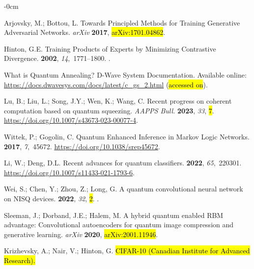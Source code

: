 \documentclass[technologies,article,accept,pdftex,moreauthors]{Definitions/mdpi}
\begin{document}
\begin{adjustwidth}{-\extralength}{0cm}
\begin{thebibliography}{999}
Arjovsky, M.; Bottou, L. Towards Principled Methods for Training Generative Adversarial Networks. \emph{arXiv} \textbf{2017},  \hl{arXiv:1701.04862}.
 

Hinton, G.E.
\newblock Training Products of Experts by Minimizing Contrastive Divergence.
 {\bf 2002}, {\em 14},~1771--1800.
.

{W}hat is {Q}uantum {A}nnealing? {D}-{W}ave {S}ystem {D}ocumentation.
 Available online: \url{https://docs.dwavesys.com/docs/latest/c_gs_2.html} (\hl{accessed on}). 

Lu, B.; Liu, L.; Song, J.Y.; Wen, K.; Wang, C.
\newblock Recent progress on coherent computation based on quantum squeezing. {\em {AAPPS} Bull.} {\bf 2023}, {\em 33}, \hl{7}. {\url{https://doi.org/10.1007/s43673-023-00077-4}}.

Wittek, P.; Gogolin, C.
\newblock Quantum Enhanced Inference in Markov Logic Networks.
 {\bf 2017}, {\em 7},~45672. {\url{https://doi.org/10.1038/srep45672}}.

Li, W.; Deng, D.L.
\newblock Recent advances for quantum classifiers.
 {\bf 2022}, {\em
  65},~220301.  {\url{https://doi.org/10.1007/s11433-021-1793-6}}.

Wei, S.; Chen, Y.; Zhou, Z.; Long, G.
\newblock A quantum convolutional neural network on NISQ devices.
 {\bf 2022}, {\em 32}, \hl{2}.
.

Sleeman, J.; Dorband, J.E.; Halem, M.
\newblock A hybrid quantum enabled RBM advantage: Convolutional autoencoders
  for quantum image compression and generative learning. \emph{arXiv} \textbf{2020},  \hl{arXiv:2001.11946}.

Krizhevsky, A.; Nair, V.; Hinton, G.
\newblock \hl{CIFAR-10 (Canadian Institute for Advanced Research).}%



\end{thebibliography}
\end{adjustwidth}
\end{document}
